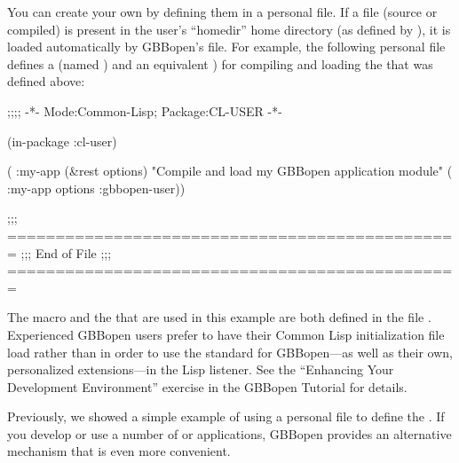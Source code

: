 \documentclass[10pt,twoside,english,pdftex]{article}
\begin{document}
%
%
%
%
%
%
You can create your own  by defining them in a personal
 file.  If a 
file (source or compiled) is present in the user's ``homedir'' home directory
(as defined by ), it is loaded
automatically by GBBopen's  file.  For example, the
following personal  file defines a
 (named ) and an equivalent
 ) for compiling and loading the
  that was defined above:
%
\W\supp\notpretop
\begin{example}
  ;;;; -*- Mode:Common-Lisp; Package:CL-USER -*-

  (in-package :cl-user)

  ( :my-app (&rest options)
    "Compile and load my GBBopen application module"
    ( :my-app options :gbbopen-user))

  ;;; ===============================================
  ;;;   End of File
  ;;; ===============================================
\end{example}

The macro  and the 
 that are used in this example are both defined
in the file .
Experienced GBBopen users prefer to have their Common Lisp initialization file
load  rather than
 in order to use the
standard  for GBBopen---as well as their own,
personalized extensions---in the Lisp listener.  See the ``Enhancing Your
Development Environment'' exercise in the GBBopen Tutorial for details.

\label{sec:personal-gbbopen-modules-directory}

%
%
%
%
%
%
Previously, we showed a simple example of using a personal
 file to define the 
.  If you develop or use a number of  or
applications, GBBopen provides an alternative mechanism that is even more
convenient.
\end{document}
